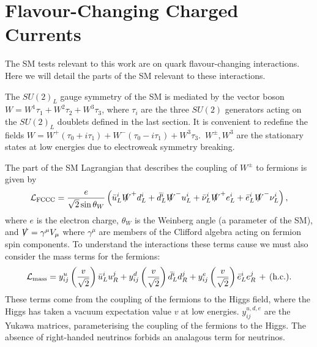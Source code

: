 \section{Flavour-Changing Charged Currents}
\label{sec:fccc}

The SM tests relevant to this work are on quark flavour-changing interactions. Here we will detail the parts of the SM relevant to these interactions.

The $SU(2)_L$ gauge symmetry of the SM is mediated by the vector boson $W=W^1\tau_1 + W^2\tau_2 + W^3\tau_3$, where $\tau_i$ are the three $SU(2)$ generators acting on the $SU(2)_L$ doublets defined in the last section. It is convenient to redefine the fields $W = W^+ ( \tau_0 + i\tau_1 ) + W^- ( \tau_0 - i\tau_1 ) + W^3 \tau_3$.\, $W^{\pm},W^3$ are the stationary states at low energies due to electroweak symmetry breaking.

The part of the SM Lagrangian that describes the coupling of $W^{\pm}$ to fermions is given by
\begin{align}
  \mathcal{L}_{\text{FCCC}} = {e\over \sqrt{2}\sin\theta_W} \left( \bar{u}_L^i \slashed{W}^+ d_L^i + \bar{d}_L^i \slashed{W}^- u_L^i + \bar{\nu}_L^i \slashed{W}^+ e_L^i + \bar{e}_L^i \slashed{W}^- \nu_L^i \right),
  \label{eq:FCCC}
\end{align}
where $e$ is the electron charge, $\theta_W$ is the Weinberg angle (a parameter of the SM), and $\slashed{V} = \gamma^{\mu} V_{\mu}$ where $\gamma^{\mu}$ are members of the Clifford algebra acting on fermion spin components. To understand the interactions these terms cause we must also consider the mass terms for the fermions:
\begin{align}
  \mathcal{L}_{\text{mass}} = y_{ij}^u \left({v\over \sqrt{2}}\right) \bar{u}_L^i u_R^j + y_{ij}^d \left({v\over \sqrt{2}}\right) \bar{d}_L^i d_R^j + y_{ij}^e \left({v\over \sqrt{2}}\right) \bar{e}_L^i e_R^j \,+\,(\text{h.c.}).
\end{align}
These terms come from the coupling of the fermions to the Higgs field, where the Higgs has taken a vacuum expectation value $v$ at low energies. $y^{u,d,e}_{ij}$ are the Yukawa matrices, parameterising the coupling of the fermions to the Higgs. The absence of right-handed neutrinos forbids an analagous term for neutrinos.

